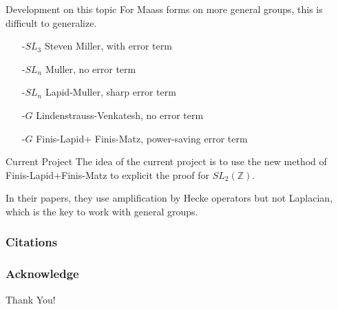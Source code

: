 \documentclass[aspectratio=169]{beamer}
\theoremstyle{plain}
\theoremstyle{definition}
\theoremstyle{remark}
\begin{document}
\begin{frame}{Development on this topic}
    For Maass forms on more general groups, this is difficult to generalize. 
    \begin{enumerate}
        \item[-$SL_{3}$] Steven Miller, with error term
        \item[-$SL_{n}$] Muller, no error term
        \item[-$SL_{n}$] Lapid-Muller, sharp error term
        \item[-$G$] Lindenstrauss-Venkatesh,  no error term
        \item[-$G$] Finis-Lapid+ Finis-Matz, power-saving error term
    \end{enumerate}
\end{frame}
\begin{frame}{Current Project}
    The idea of the current project is to use the new method of Finis-Lapid+Finis-Matz to explicit the proof for $SL_{2}(\mathbb{Z})$.
    
    \vspace{0.5cm}
    
    In their papers, they use amplification by Hecke operators but not Laplacian, which is the key to work with general groups. 
\end{frame}


\begin{frame}[allowframebreaks]
\frametitle{Citations}


\end{frame}

\begin{frame}
\frametitle{Acknowledge}
\Huge{\centerline{Thank You!}}

\end{frame}
\end{document}
